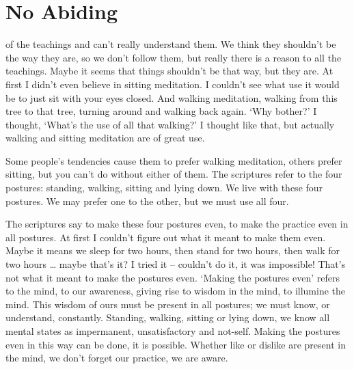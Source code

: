 
\chapter{No Abiding}

\vspace*{0.5\baselineskip}
 of the teachings and can't really understand them. We think they shouldn't be the way they are, so we don't follow them, but really there is a reason to all the teachings. Maybe it seems that things shouldn't be that way, but they are. At first I didn't even believe in sitting meditation. I couldn't see what use it would be to just sit with your eyes closed. And walking meditation, walking from this tree to that tree, turning around and walking back again. `Why bother?' I thought, `What's the use of all that walking?' I thought like that, but actually walking and sitting meditation are of great use.

Some people's tendencies cause them to prefer walking meditation, others prefer sitting, but you can't do without either of them. The scriptures refer to the four postures: standing, walking, sitting and lying down. We live with these four postures. We may prefer one to the other, but we must use all four.

The scriptures say to make these four postures even, to make the practice even in all postures. At first I couldn't figure out what it meant to make them even. Maybe it means we sleep for two hours, then stand for two hours, then walk for two hours \ldots{} maybe that's it? I tried it -- couldn't do it, it was impossible! That's not what it meant to make the postures even. `Making the postures even' refers to the mind, to our awareness, giving rise to wisdom in the mind, to illumine the mind. This wisdom of ours must be present in all postures; we must know, or understand, constantly. Standing, walking, sitting or lying down, we know all mental states as impermanent, unsatisfactory and not-self. Making the postures even in this way can be done, it is possible. Whether like or dislike are present in the mind, we don't forget our practice, we are aware.

